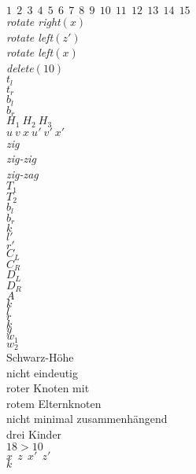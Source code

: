 \documentclass[a4paper,12pt]{article}
\begin{document}
$1~~2~~3~~4~~5~~6~~7~~8~~9~~10~~11~~12~~13~~14~~15$  \\
\textit{rotate right}$\left(x\right)$\\
\textit{rotate left}$\left(z'\right)$\\
\textit{rotate left}$\left(x\right)$\\
\textit{delete}$\left(10\right)$\\
$t_l$\\
$t_r$\\
$b_l$\\
$b_r$\\
$H_1  ~H_2 ~ H_3$\\
$u  ~v ~  x ~ u'  ~v' ~  x' $\\
\textit{zig}\\
\textit{zig-zig}\\
\textit{zig-zag}\\
$T_1$\\
$T_2$\\
$b_l$\\
$b_r$\\
$k$\\
$l'$\\
$r'$\\
$C_L$\\
$C_R$\\
$D_L$\\
$D_R$\\
$A$\\
$k$\\
$l$\\
$r$\\
$k$\\
$y$\\
$w_1$\\
$w_2$\\
\color{Red}
Schwarz-Höhe\\ nicht eindeutig\\
roter Knoten mit\\ rotem Elternknoten\\ 
nicht minimal zusammenhängend\\
drei Kinder\\
$18 > 10$\\
\color{ForestGreen}   
$x~~z~~x'~~z'$\\
$k$






\newpage


\end{document}
